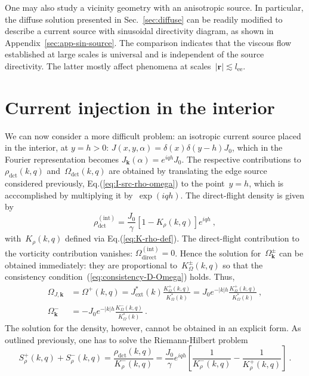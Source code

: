\documentclass[preprint,aps,eqsecnum, prb]{revtex4-1}
\newcommand{\fplus}[1]{{#1}^{+}}
\newcommand{\fminus}[1]{{#1}^{-}}
\newcommand{\fplusminus}[1]{{#1}^{\pm}}
\newcommand{\dct}[1]{{#1}_\mathrm{dct}}
\begin{document}
One may also study a vicinity geometry with an anisotropic source.
In particular, the diffuse solution presented in Sec.~\ref{sec:diffuse}
can be readily modified to describe a current source with
sinusoidal directivity diagram, as shown in Appendix~\ref{sec:app-sin-source}.
The comparison indicates that the viscous flow established at large scales
is universal and is independent of the source directivity. The latter
mostly affect phenomena at scales~$|{\bm r}| \lesssim l_\mathrm{ee}$.

\section{Current injection in the interior}
\label{sec:bulk-src}
We can now  consider a more difficult problem: 
an isotropic current source placed in the interior, at $y = h > 0$:
$J(x, y, \alpha) = \delta(x) \delta(y - h) J_0 $,
which in the Fourier representation becomes
$J_{\bm k}(\alpha) = e^{i q h} J_0$.
The respective contributions to~$\dct{\rho}(k, q)$ 
and~$\dct{\Omega}(k, q)$ are obtained by translating
the edge source considered previously, Eq.(\ref{eq:I-src-rho-omega}) 
to the point~$y = h$, which
is acccomplished by multiplying it by~$\exp(i q h)$.  The direct-flight
density is given by 
\begin{equation}
  \label{eq:source-bulk-rho}
  \dct{\rho}^\mathrm{(int)}
  = \frac{J_0}{\gamma} \left[1 - K_\rho(k, q) \right]e^{i q h}
  \ ,
\end{equation}
with~$K_\rho(k, q)$ defined via Eq.(\ref{eq:K-rho-def}). 
The direct-flight contribution to the vorticity contribution vanishes:
$\Omega_\mathrm{direct}^\mathrm{(int)} = 0$. Hence the solution
for~$\fplusminus{\Omega}_{\bm k}$ can be obtained immediately: 
they are proportional to~$\fplusminus{K}_\Omega(k, q)$
so that the consistency condition~(\ref{eq:consistency-D-Omega}) holds. 
Thus, 
\begin{align}
\label{eq:omega-J}
\Omega_{J, {\bm k}} &=  \fplus{\Omega}(k, q)
= J_\mathrm{ext}^\ast(k) \frac{\fplus{K}_\Omega(k, q)}{K_\Omega^\ast(k)}
= J_0 e^{-|k|h} \frac{\fplus{K}_\Omega(k, q)}{K_\Omega^\ast(k)}
\ ,
\\
\fminus{\Omega}_{\bm k}
&= - J_0 e^{-|k|h} \frac{\fminus{K}_\Omega(k, q)}{K_\Omega^\ast(k)}
\ .
\end{align}
The solution for the density, however, cannot be obtained in an explicit form.
As outlined previously, one has to solve the Riemann-Hilbert problem
\begin{equation}
  \label{eq:RH-rho}
  \fplus{S}_\rho(k, q) + \fminus{S}_\rho(k, q) =  
  \frac{\dct{\rho}(k, q)}{\fminus{K}_\rho(k, q)}  = 
  \frac{J_0}{\gamma} e^{iqh}
  \left[\frac{1}{\fminus{K}_\rho(k, q)} -
  \frac{1}{\fplus{K}_\rho(k, q)} \right]
  \ .
\end{equation}
\end{document}
